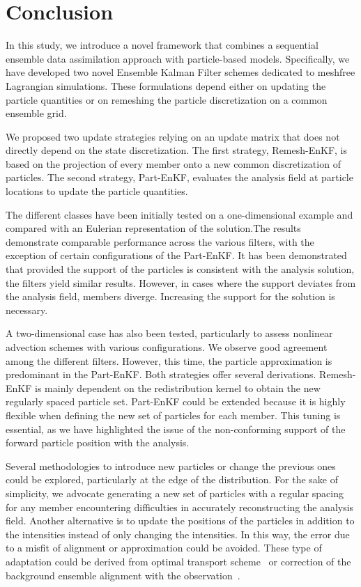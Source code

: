 
\section{Conclusion}
In this study, we introduce a novel framework that combines a sequential ensemble data assimilation approach with particle-based models. Specifically, we have developed two novel Ensemble Kalman Filter schemes dedicated to meshfree Lagrangian simulations. These formulations depend either on updating the particle quantities or on remeshing the particle discretization on a common ensemble grid.

We proposed two update strategies relying on an update matrix that does not directly depend on the state discretization. The first strategy, Remesh-EnKF, is based on the projection of every member onto a new common discretization of particles. The second strategy, Part-EnKF, evaluates the analysis field at particle locations to update the particle quantities.

The different classes have been initially tested on a one-dimensional example and compared with an Eulerian representation of the solution.The results demonstrate comparable performance across the various filters, with the exception of certain configurations of the Part-EnKF. It has been demonstrated that provided the support of the particles is consistent with the analysis solution, the filters yield similar results. However, in cases where the support deviates from the analysis field, members diverge. Increasing the support for the solution is necessary.

A two-dimensional case has also been tested, particularly to assess nonlinear advection schemes with various configurations. We observe good agreement among the different filters. However, this time, the particle approximation is predominant in the Part-EnKF.
Both strategies offer several derivations. Remesh-EnKF is mainly dependent on the redistribution kernel to obtain the new regularly spaced particle set. Part-EnKF could be extended because it is highly flexible when defining the new set of particles for each member. This tuning is essential, as we have highlighted the issue of the non-conforming support of the forward particle position with the analysis.

Several methodologies to introduce new particles or change the previous ones could be explored, particularly at the edge of the distribution.
For the sake of simplicity, we advocate generating a new set of particles with a regular spacing for any member encountering difficulties in accurately reconstructing the analysis field.
Another alternative is to update the positions of the particles in addition to the intensities instead of only changing the intensities. In this way, the error due to a misfit of alignment or approximation could be avoided. These type of adaptation could be derived from optimal transport scheme~\cite{bocquet_bridging_2023} or correction of the background ensemble alignment with the observation~\cite{ravela_data_2007,rosenthal_displacement_2017}.

\newpage